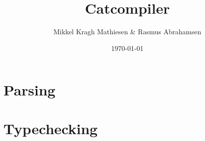 \documentclass{article}
\author{Mikkel Kragh Mathiesen \& Rasmus Abrahamsen}
\title{Catcompiler}
\date{\today}
\begin{document}
\maketitle

\section{Parsing}

\section{Typechecking}
\end{document}
